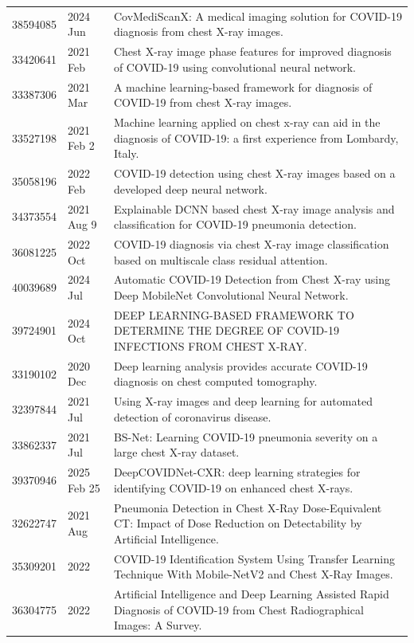 \begin{longtable}{llp{9.5cm}}
38594085 & 2024 Jun & CovMediScanX: A medical imaging solution for COVID-19 diagnosis from chest X-ray images. \\
33420641 & 2021 Feb & Chest X-ray image phase features for improved diagnosis of COVID-19 using convolutional neural network. \\
33387306 & 2021 Mar & A machine learning-based framework for diagnosis of COVID-19 from chest X-ray images. \\
33527198 & 2021 Feb 2 & Machine learning applied on chest x-ray can aid in the diagnosis of COVID-19: a first experience from Lombardy, Italy. \\
35058196 & 2022 Feb & COVID-19 detection using chest X-ray images based on a developed deep neural network. \\
34373554 & 2021 Aug 9 & Explainable DCNN based chest X-ray image analysis and classification for COVID-19 pneumonia detection. \\
36081225 & 2022 Oct & COVID-19 diagnosis via chest X-ray image classification based on multiscale class residual attention. \\
40039689 & 2024 Jul & Automatic COVID-19 Detection from Chest X-ray using Deep MobileNet Convolutional Neural Network. \\
39724901 & 2024 Oct & DEEP LEARNING-BASED FRAMEWORK TO DETERMINE THE DEGREE OF COVID-19 INFECTIONS FROM CHEST X-RAY. \\
33190102 & 2020 Dec & Deep learning analysis provides accurate COVID-19 diagnosis on chest computed tomography. \\
32397844 & 2021 Jul & Using X-ray images and deep learning for automated detection of coronavirus disease. \\
33862337 & 2021 Jul & BS-Net: Learning COVID-19 pneumonia severity on a large chest X-ray dataset. \\
39370946 & 2025 Feb 25 & DeepCOVIDNet-CXR: deep learning strategies for identifying COVID-19 on enhanced chest X-rays. \\
32622747 & 2021 Aug & Pneumonia Detection in Chest X-Ray Dose-Equivalent CT: Impact of Dose Reduction on Detectability by Artificial Intelligence. \\
35309201 & 2022 & COVID-19 Identification System Using Transfer Learning Technique With Mobile-NetV2 and Chest X-Ray Images. \\
36304775 & 2022 & Artificial Intelligence and Deep Learning Assisted Rapid Diagnosis of COVID-19 from Chest Radiographical Images: A Survey. \\

\end{longtable}
